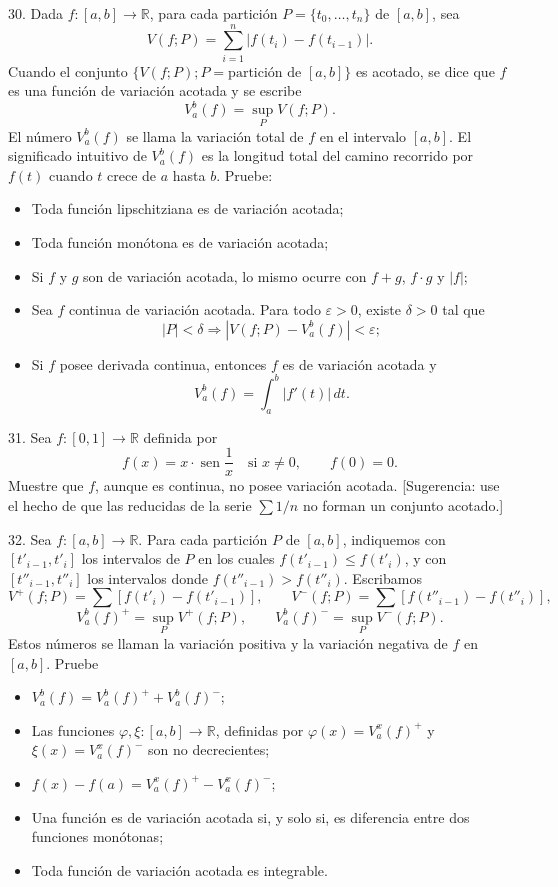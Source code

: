 \documentclass[12pt,oneside]{book}
\begin{document}
30. Dada \(f: [a, b] \to \mathbb{R}\), para cada partición \(P = \{t_0, \dots, t_n\}\) de \([a, b]\), sea
\[
V(f; P) = \sum_{i=1}^n |f(t_i) - f(t_{i-1})|.
\]
Cuando el conjunto \(\{V(f; P); P = \text{partición de } [a, b]\}\) es acotado, se dice que \(f\) es una función de variación acotada y se escribe
\[
V_a^b(f) = \sup_P V(f; P).
\]
El número \(V_a^b(f)\) se llama la variación total de \(f\) en el intervalo \([a, b]\). El significado intuitivo de \(V_a^b(f)\) es la longitud total del camino recorrido por \(f(t)\) cuando \(t\) crece de \(a\) hasta \(b\). Pruebe:
\begin{itemize}
    \item[1.] Toda función lipschitziana es de variación acotada;
    \item[2.] Toda función monótona es de variación acotada;
    \item[3.] Si \(f\) y \(g\) son de variación acotada, lo mismo ocurre con \(f + g\), \(f \cdot g\) y \(|f|\);
    \item[4.] Sea \(f\) continua de variación acotada. Para todo \(\varepsilon > 0\), existe \(\delta > 0\) tal que
\[
|P| < \delta \Rightarrow |V(f; P) - V_a^b(f)| < \varepsilon;
\]
    \item[5.] Si \(f\) posee derivada continua, entonces \(f\) es de variación acotada y
\[
V_a^b(f) = \int_a^b |f'(t)| \, dt.
\]
\end{itemize}

31. Sea \(f: [0, 1] \to \mathbb{R}\) definida por
\[
f(x) = x \cdot \operatorname{sen} \frac{1}{x} \quad \text{si } x \neq 0, \qquad f(0) = 0.
\]
Muestre que \(f\), aunque es continua, no posee variación acotada. [Sugerencia: use el hecho de que las reducidas de la serie \(\sum 1/n\) no forman un conjunto acotado.]

32. Sea \(f: [a, b] \to \mathbb{R}\). Para cada partición \(P\) de \([a, b]\), indiquemos con \([t'_{i-1}, t'_i]\) los intervalos de \(P\) en los cuales \(f(t'_{i-1}) \leq f(t'_i)\), y con \([t''_{i-1}, t''_i]\) los intervalos donde \(f(t''_{i-1}) > f(t''_i)\). Escribamos
\[
V^+(f; P) = \sum [f(t'_i) - f(t'_{i-1})], \qquad
V^-(f; P) = \sum [f(t''_{i-1}) - f(t''_i)],
\]
\[
V_a^b(f)^+ = \sup_P V^+(f; P), \qquad
V_a^b(f)^- = \sup_P V^-(f; P).
\]
Estos números se llaman la variación positiva y la variación negativa de \(f\) en \([a, b]\). Pruebe
\begin{itemize}
    \item[1.] \( V_a^b(f) = V_a^b(f)^+ + V_a^b(f)^- \);

    \item[2.] Las funciones \(\varphi, \xi: [a, b] \to \mathbb{R}\), definidas por \(\varphi(x) = V_a^x(f)^+\) y \(\xi(x) = V_a^x(f)^-\) son no decrecientes;

    \item[3.] \( f(x) - f(a) = V_a^x(f)^+ - V_a^x(f)^- \);

    \item[4.] Una función es de variación acotada si, y solo si, es diferencia entre dos funciones monótonas;

    \item[5.] Toda función de variación acotada es integrable.
\end{itemize}
\end{document}
